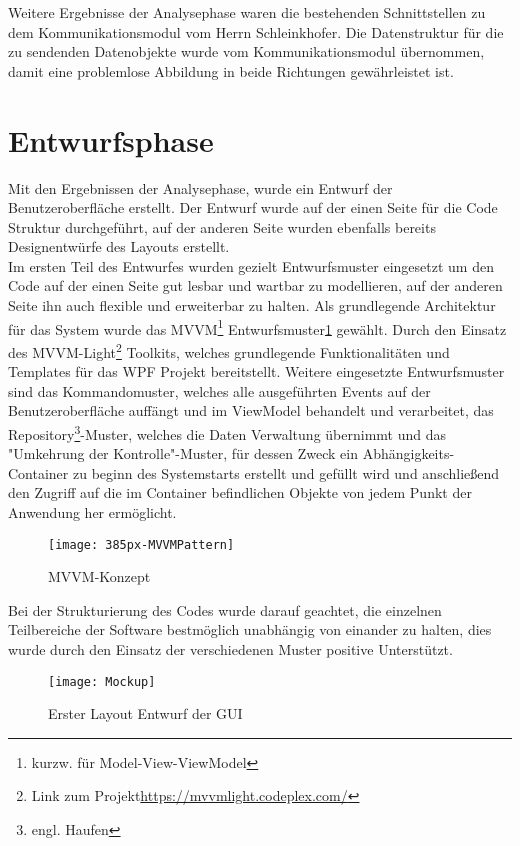 Weitere Ergebnisse der Analysephase waren die bestehenden Schnittstellen zu dem Kommunikationsmodul vom Herrn Schleinkhofer. Die Datenstruktur für die zu sendenden Datenobjekte wurde vom Kommunikationsmodul übernommen, damit eine problemlose Abbildung in beide Richtungen gewährleistet ist. 

\section{Entwurfsphase}
Mit den Ergebnissen der Analysephase, wurde ein Entwurf der Benutzeroberfläche erstellt. Der Entwurf wurde auf der einen Seite für die Code Struktur durchgeführt, auf der anderen Seite wurden ebenfalls bereits Designentwürfe des Layouts erstellt.\\
Im ersten Teil des Entwurfes wurden gezielt Entwurfsmuster eingesetzt um den Code auf der einen Seite gut lesbar und wartbar zu modellieren, auf der anderen Seite ihn auch flexible und erweiterbar zu halten. Als grundlegende Architektur für das System wurde das MVVM\footnote{kurzw. für Model-View-ViewModel} Entwurfsmuster\ref{fig:mvvm} gewählt. Durch den Einsatz des MVVM-Light\footnote{Link zum Projekt\url{https://mvvmlight.codeplex.com/}} Toolkits, welches grundlegende Funktionalitäten und Templates für das WPF Projekt bereitstellt. Weitere eingesetzte Entwurfsmuster sind das Kommandomuster, welches alle ausgeführten Events auf der Benutzeroberfläche auffängt und im ViewModel behandelt und verarbeitet, das Repository\footnote{engl. Haufen}-Muster, welches die Daten Verwaltung übernimmt und das "Umkehrung der Kontrolle"-Muster, für dessen Zweck ein Abhängigkeits-Container zu beginn des Systemstarts erstellt und gefüllt wird und anschließend den Zugriff auf die im Container befindlichen Objekte von jedem Punkt der Anwendung her ermöglicht.\\

\begin{figure}[h]
	\centering
		\texttt{[image: 385px-MVVMPattern]}
		\caption{MVVM-Konzept}
		\label{fig:mvvm}
\end{figure}

Bei der Strukturierung des Codes wurde darauf geachtet, die einzelnen Teilbereiche der Software bestmöglich unabhängig von einander zu halten, dies wurde durch den Einsatz der verschiedenen Muster positive Unterstützt.

\begin{figure}[h]
	\centering
		\texttt{[image: Mockup]}
		\caption{Erster Layout Entwurf der GUI}
		\label{fig:gui}
\end{figure}

